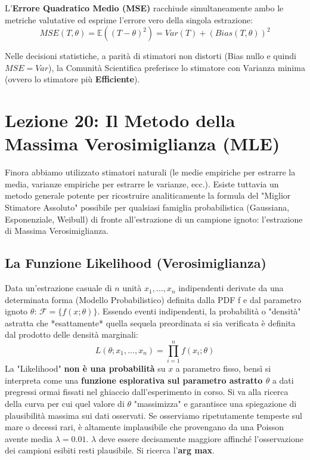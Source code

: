 \documentclass[12pt, a4paper]{article}
\begin{document}
L'\textbf{Errore Quadratico Medio (MSE)} racchiude simultaneamente ambo le metriche valutative ed esprime l'errore vero della singola estrazione:
$$ MSE(T, \theta) = \mathbb{E}((T - \theta)^2) = Var(T) + (Bias(T, \theta))^2 $$

Nelle decisioni statistiche, a parità di stimatori non distorti (Bias nullo e quindi $MSE = Var$), la Comunità Scientifica preferisce lo stimatore con Varianza minima (ovvero lo stimatore più \textbf{Efficiente}).


\section{Lezione 20: Il Metodo della Massima Verosimiglianza (MLE)}

Finora abbiamo utilizzato stimatori naturali (le medie empiriche per estrarre la media, varianze empiriche per estrarre le varianze, ecc.). Esiste tuttavia un metodo generale potente per ricostruire analiticamente la formula del "Miglior Stimatore Assoluto" possibile per qualsiasi famiglia probabilistica (Gaussiana, Esponenziale, Weibull) di fronte all'estrazione di un campione ignoto: l'estrazione di Massima Verosimiglianza.

\subsection{La Funzione Likelihood (Verosimiglianza)}
Data un'estrazione casuale di $n$ unità $x_1, \dots, x_n$ indipendenti derivate da una determinata forma (Modello Probabilistico) definita dalla PDF f e dal parametro ignoto $\theta$: $\mathcal{F} = \{f(x; \theta)\}$.
Essendo eventi indipendenti, la probabilità o "densità" astratta che *esattamente* quella sequela preordinata si sia verificata è definita dal prodotto delle densità marginali:
$$ L(\theta; x_1, \dots, x_n) = \prod_{i=1}^n f(x_i; \theta) $$
La "Likelihood" \textbf{non è una probabilità} su $x$ a parametro fisso, bensì si interpreta come una \textbf{funzione esplorativa sul parametro astratto $\theta$} a dati pregressi ormai fissati nel ghiaccio dall'esperimento in corso. 
Si va alla ricerca della curva per cui quel valore di $\theta$ "massimizza" e garantisce una spiegazione di plausibilità massima sui dati osservati. 
Se osserviamo ripetutamente tempeste sul mare o decessi rari, è altamente implausibile che provengano da una Poisson avente media $\lambda=0.01$. $\lambda$ deve essere decisamente maggiore affinché l'osservazione dei campioni esibiti resti plausibile. Si ricerca l'\textbf{arg max}.
\end{document}
